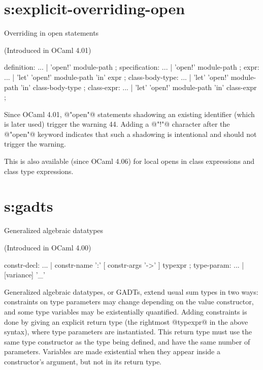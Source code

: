 \section{s:explicit-overriding-open}{Overriding in open statements}

(Introduced in OCaml 4.01)

\begin{syntax}
definition:
      ...
   |  'open!' module-path
;
specification:
      ...
   |  'open!' module-path
;
expr:
       ...
     | 'let' 'open!' module-path 'in' expr
;
class-body-type:
       ...
   |  'let' 'open!' module-path 'in' class-body-type
;
class-expr:
       ...
   |  'let' 'open!' module-path 'in' class-expr
;
\end{syntax}

Since OCaml 4.01, @"open"@ statements shadowing an existing identifier
(which is later used) trigger the warning 44.  Adding a @"!"@
character after the @"open"@ keyword indicates that such a shadowing is
intentional and should not trigger the warning.

This is also available (since OCaml 4.06) for local opens in class
expressions and class type expressions.

\section{s:gadts}{Generalized algebraic datatypes} 


(Introduced in OCaml 4.00)

\begin{syntax}
constr-decl:
          ...
        | constr-name ':' [ constr-args '->' ] typexpr
;
type-param:
          ...
        | [variance] '_'
\end{syntax}

Generalized algebraic datatypes, or GADTs, extend usual sum types in
two ways: constraints on type parameters may change depending on the
value constructor, and some type variables may be existentially
quantified.
Adding constraints is done by giving an explicit return type
(the rightmost @typexpr@ in the above syntax), where type parameters
are instantiated.
This return type must use the same type constructor as the type being
defined, and have the same number of parameters.
Variables are made existential when they appear inside a constructor's
argument, but not in its return type.

